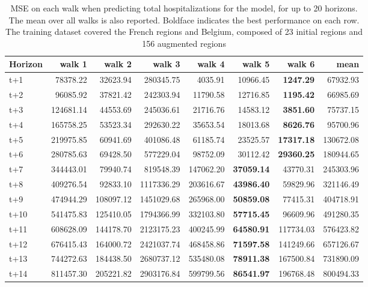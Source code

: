 \begin{table}[H]
\centering
\caption{MSE on each walk when predicting total hospitalizations for the model, for up to 20 horizons. The mean over all walks is also reported. Boldface indicates the best performance on each row. The training dataset covered the French regions and Belgium, composed of 23 initial regions and 156 augmented regions }
\label{tab:MSE_walk_encoder_decoder}
\begin{tabular}{lrrrrrrr}
\toprule
Horizon &     walk 1 &    walk 2 &     walk 3 &    walk 4 &    walk 5 &    walk 6 &       mean \\
\midrule
t+1  & 78378.22  & 32623.94  & 280345.75  & 4035.91  & 10966.45  & \textbf{1247.29}  & 67932.93  \\
t+2  & 96085.92  & 37821.42  & 242303.94  & 11790.58  & 12716.85  & \textbf{1195.42}  & 66985.69  \\
t+3  & 124681.14  & 44553.69  & 245036.61  & 21716.76  & 14583.12  & \textbf{3851.60}  & 75737.15  \\
t+4  & 165758.25  & 53523.34  & 292630.22  & 35653.54  & 18013.68  & \textbf{8626.76}  & 95700.96  \\
t+5  & 219975.85  & 60941.69  & 401086.48  & 61185.74  & 23525.57  & \textbf{17317.18}  & 130672.08  \\
t+6  & 280785.63  & 69428.50  & 577229.04  & 98752.09  & 30112.42  & \textbf{29360.25}  & 180944.65  \\
t+7  & 344443.01  & 79940.74  & 819548.39  & 147062.20  & \textbf{37059.14}  & 43770.31  & 245303.96  \\
t+8  & 409276.54  & 92833.10  & 1117336.29  & 203616.67  & \textbf{43986.40}  & 59829.96  & 321146.49  \\
t+9  & 474944.29  & 108097.12  & 1451029.68  & 265968.00  & \textbf{50859.08}  & 77415.31  & 404718.91  \\
t+10  & 541475.83  & 125410.05  & 1794366.99  & 332103.80  & \textbf{57715.45}  & 96609.96  & 491280.35  \\
t+11  & 608628.09  & 144178.70  & 2123175.23  & 400245.99  & \textbf{64580.91}  & 117734.03  & 576423.82  \\
t+12  & 676415.43  & 164000.72  & 2421037.74  & 468458.86  & \textbf{71597.58}  & 141249.66  & 657126.67  \\
t+13  & 744272.63  & 184438.50  & 2680737.12  & 535480.08  & \textbf{78911.38}  & 167500.84  & 731890.09  \\
t+14  & 811457.30  & 205221.82  & 2903176.84  & 599799.56  & \textbf{86541.97}  & 196768.48  & 800494.33  \\

\end{tabular}
\end{table}
